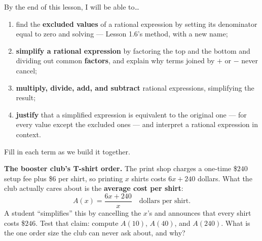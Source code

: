 \documentclass[10pt]{article}
\begin{document}

\vspace{0.15in}

\begin{objectivebox}
\small
By the end of this lesson, I will be able to\dots
\begin{enumerate}[leftmargin=1.5em, itemsep=2pt, topsep=3pt]
  \item find the \textbf{excluded values} of a rational expression by setting its denominator equal
        to zero and solving --- Lesson 1.6's method, with a new name;
  \item \textbf{simplify a rational expression} by factoring the top and the bottom and dividing
        out common \textbf{factors}, and explain why terms joined by $+$ or $-$ never cancel;
  \item \textbf{multiply, divide, add, and subtract} rational expressions, simplifying the result;
  \item \textbf{justify} that a simplified expression is equivalent to the original one --- for
        every value except the excluded ones --- and interpret a rational expression in context.
\end{enumerate}
\end{objectivebox}

\vspace{0.10in}

\boxguard
\begin{vocabbox}
\small
Fill in each term as we build it together.
\end{vocabbox}

\vspace{0.10in}

\boxguard[12]
\begin{hookbox}
\small
\textbf{The booster club's T-shirt order.} The print shop charges a one-time \$$240$ setup fee plus
\$$6$ per shirt, so printing $x$ shirts costs $6x+240$ dollars. What the club actually cares about
is the \textbf{average cost per shirt}:
\[ A(x) = \frac{6x+240}{x} \quad \text{dollars per shirt.} \]
A student ``simplifies'' this by cancelling the $x$'s and announces that every shirt costs \$$246$.
Test that claim: compute $A(10)$, $A(40)$, and $A(240)$. What is the one order size the club can
never ask about, and why?

\end{hookbox}
\end{document}
